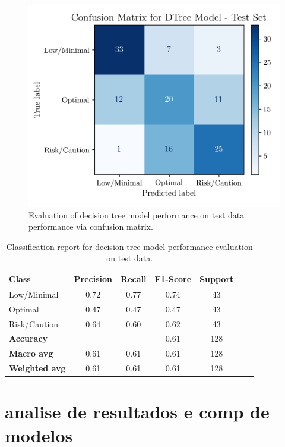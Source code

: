 \documentclass[conference]{IEEEtran}
\begin{document}
\begin{figure}[H]
    \centering
    \includegraphics[width=1\linewidth]{assets/DTREE_ConfusionMatrixTest.png}
    \caption{Evaluation of decision tree model performance on test data performance via confusion matrix.}
    \label{dtree_cmtest}
\end{figure} %

\begin{table}[H]
\centering
\caption{Classification report for decision tree model performance evaluation on test data.}
\label{cr_dtree_test}
\begin{tabular}{lcccccc}
\toprule
\textbf{Class} & \textbf{Precision} & \textbf{Recall} & \textbf{F1-Score} & \textbf{Support} \\
\midrule
Low/Minimal & 0.72 & 0.77 & 0.74 & 43 \\
Optimal & 0.47 & 0.47 & 0.47 & 43 \\
Risk/Caution & 0.64 & 0.60 & 0.62 & 43 \\
\midrule
\textbf{Accuracy} &  &  & 0.61 & 128 \\
\textbf{Macro avg} & 0.61 & 0.61 & 0.61 & 128 \\
\textbf{Weighted avg} & 0.61 & 0.61 & 0.61 & 128 \\
\bottomrule
\end{tabular}
\end{table} %



\section{analise de resultados e comp de modelos}
\end{document}
